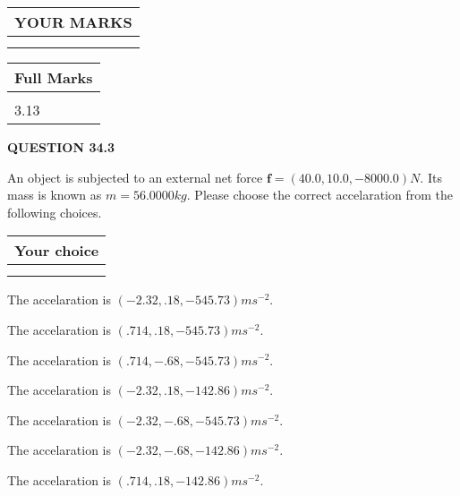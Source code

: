 \documentclass[12pt]{article}
\begin{document}
 
 
 

 
\vspace{0.3in}
  
\vspace{0.2in}
  
\noindent\begin{tabular}{|l|}
\hline
 YOUR MARKS  \\
\hline
 \\ 
 \\ 
\hline
\end{tabular}
\hspace{0.05in} \begin{tabular}{|l|}
\hline
 Full Marks  \\
\hline
 \\ 
3.13 \\
\hline
\end{tabular}
{\textbf{\Large{QUESTION
34.3 
}}}
  
  
 
 
An object is subjected to an external net force $\mathbf{f}=
(40.0 , 10.0 , -8000.0) N$.
Its mass is known as $m= %
56.0000 kg$. Please choose the
correct accelaration from the following choices.
 
  
  
\noindent\hspace{3.0in} \begin{tabular}{|l|}
\hline
Your choice \\
\hline
 \\ 
 \\ 
\hline
\end{tabular}
  
  
 
 
The accelaration is $  %
(
-2.32,
.18,
-545.73)
ms^{-2} $.
 
 
The accelaration is $  %
(
.714,
.18,
-545.73)
ms^{-2} $.
 
 
The accelaration is $  %
(
.714,
-.68,
-545.73)
ms^{-2} $.
 
 
The accelaration is $  %
(
-2.32,
.18,
-142.86)
ms^{-2} $.
 
 
The accelaration is $  %
(
-2.32,
-.68,
-545.73)
ms^{-2} $.
 
 
The accelaration is $  %
(
-2.32,
-.68,
-142.86)
ms^{-2} $.
 
 
The accelaration is $  %
(
.714,
.18,
-142.86)
ms^{-2} $.
 
\end{document}
